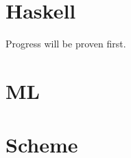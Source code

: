 \documentclass[12pt]{article}
\begin{document}
\section{Haskell}
Progress will be proven first.  




\section{ML}




\section{Scheme}




\end{document}
